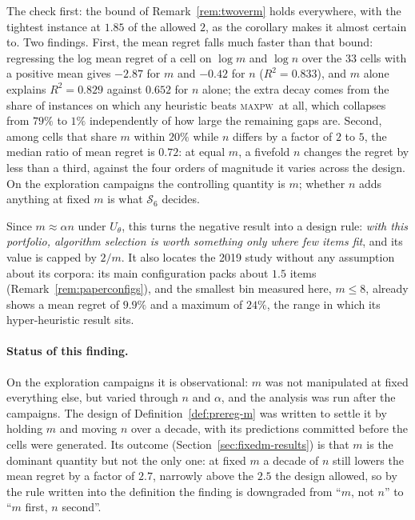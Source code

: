 \documentclass[a4paper,11pt]{article}
\newcommand{\Utheta}{U_{\theta}}
\newcommand{\MAXPW}{\textsc{maxpw}}
\theoremstyle{plain}
\theoremstyle{definition}
\theoremstyle{remark}
\begin{document}
The check first: the bound of Remark~\ref{rem:twoverm} holds everywhere, with the tightest
instance at $1.85$ of the allowed $2$, as the corollary makes it almost certain to. Two
findings. First, the mean regret falls much faster than that bound: regressing the log mean regret of a cell on $\log m$ and $\log n$ over the $33$
cells with a positive mean gives $-2.87$ for $m$ and $-0.42$ for $n$ ($R^{2}=0.833$), and $m$
alone explains $R^{2}=0.829$ against $0.652$ for $n$ alone; the extra decay comes from the
share of instances on which any heuristic beats \MAXPW\ at all, which collapses from $79\%$ to
$1\%$ independently of how large the remaining gaps are. Second, among cells that share $m$
within $20\%$ while $n$ differs by a factor of $2$ to $5$, the median ratio of mean regret is
$0.72$: at equal $m$, a fivefold $n$ changes the regret by less than a third, against the four
orders of magnitude it varies across the design. On the exploration campaigns the controlling quantity is $m$; whether $n$ adds anything at
fixed $m$ is what $\mathcal S_6$ decides.

Since $m\approx\alpha n$ under $\Utheta$, this turns the negative result into a design rule:
\emph{with this portfolio, algorithm selection is worth something only where few items fit},
and its value is capped by $2/m$. It also locates the 2019 study without any assumption about
its corpora: its main configuration packs about $1.5$ items
(Remark~\ref{rem:paperconfigs}), and the smallest bin measured here, $m\le8$, already shows a
mean regret of $9.9\%$ and a maximum of $24\%$, the range in which its hyper-heuristic result
sits.

\paragraph{Status of this finding.} On the exploration campaigns it is observational: $m$ was
not manipulated at fixed everything else, but varied through $n$ and $\alpha$, and the
analysis was run after the campaigns. The design of Definition~\ref{def:prereg-m} was
written to settle it by holding $m$ and moving $n$ over a decade, with its predictions
committed before the cells were generated. Its outcome (Section~\ref{sec:fixedm-results})
is that $m$ is the dominant quantity but not the only one: at fixed $m$ a decade of $n$
still lowers the mean regret by a factor of $2.7$, narrowly above the $2.5$ the design
allowed, so by the rule written into the definition the finding is downgraded from
``$m$, not $n$'' to ``$m$ first, $n$ second''.
\end{document}
